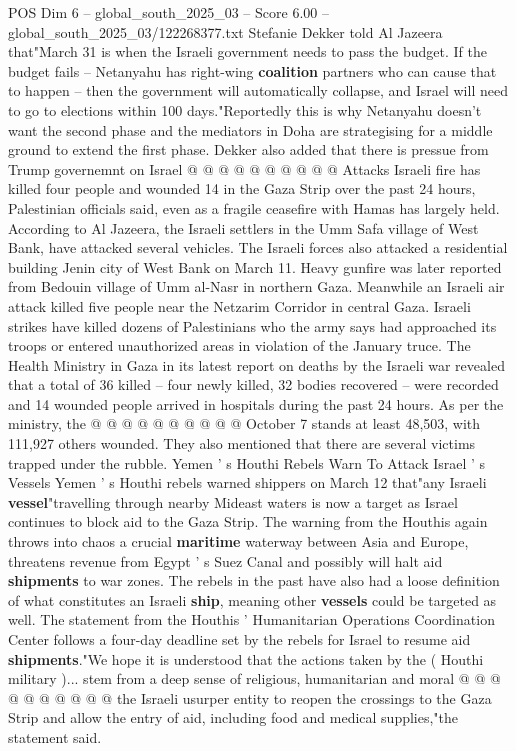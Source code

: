 \begin{textsample}{POS Dim 6 – global\_south\_2025\_03 – Score 6.00 – global\_south\_2025\_03/122268377.txt}
Stefanie Dekker told Al Jazeera that"March 31 is when the Israeli government needs to pass the budget.
If the budget fails -- Netanyahu has right-wing \textbf{coalition} partners who can cause that to happen -- then the government will automatically collapse, and Israel will need to go to elections within 100 days."Reportedly this is why Netanyahu doesn't want the second phase and the mediators in Doha are strategising for a middle ground to extend the first phase.
Dekker also added that there is pressue from Trump governemnt on Israel @ @ @ @ @ @ @ @ @ @ Attacks Israeli fire has killed four people and wounded 14 in the Gaza Strip over the past 24 hours, Palestinian officials said, even as a fragile ceasefire with Hamas has largely held.
According to Al Jazeera, the Israeli settlers in the Umm Safa village of West Bank, have attacked several vehicles.
The Israeli forces also attacked a residential building Jenin city of West Bank on March 11.
Heavy gunfire was later reported from Bedouin village of Umm al-Nasr in northern Gaza.
Meanwhile an Israeli air attack killed five people near the Netzarim Corridor in central Gaza.
Israeli strikes have killed dozens of Palestinians who the army says had approached its troops or entered unauthorized areas in violation of the January truce.
The Health Ministry in Gaza in its latest report on deaths by the Israeli war revealed that a total of 36 killed -- four newly killed, 32 bodies recovered -- were recorded and 14 wounded people arrived in hospitals during the past 24 hours.
As per the ministry, the @ @ @ @ @ @ @ @ @ @ October 7 stands at least 48,503, with 111,927 others wounded.
They also mentioned that there are several victims trapped under the rubble.
Yemen ' s Houthi Rebels Warn To Attack Israel ' s Vessels Yemen ' s Houthi rebels warned shippers on March 12 that"any Israeli \textbf{vessel}"travelling through nearby Mideast waters is now a target as Israel continues to block aid to the Gaza Strip.
The warning from the Houthis again throws into chaos a crucial \textbf{maritime} waterway between Asia and Europe, threatens revenue from Egypt ' s Suez Canal and possibly will halt aid \textbf{shipments} to war zones.
The rebels in the past have also had a loose definition of what constitutes an Israeli \textbf{ship}, meaning other \textbf{vessels} could be targeted as well.
The statement from the Houthis ' Humanitarian Operations Coordination Center follows a four-day deadline set by the rebels for Israel to resume aid \textbf{shipments}."We hope it is understood that the actions taken by the ( Houthi military )... stem from a deep sense of religious, humanitarian and moral @ @ @ @ @ @ @ @ @ @ the Israeli usurper entity to reopen the crossings to the Gaza Strip and allow the entry of aid, including food and medical supplies,"the statement said.

\end{textsample}
